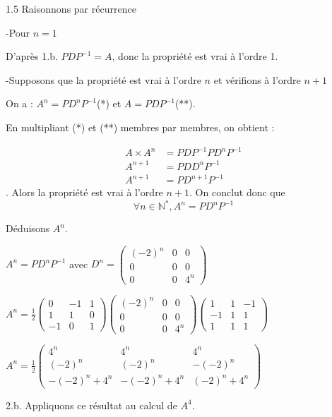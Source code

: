\documentclass[12pt]{article}
\begin{document}
\begin{spacing}{1.5}
Raisonnons par récurrence

-Pour $n=1$

D'après 1.b. $PDP^{-1}=A$, donc la propriété est vrai à l'ordre 1.

-Supposons que la propriété est vrai à l'ordre $n$ et vérifions à l'ordre $n+1$

On a : $A^n = PD^nP^{-1}$(*) et  $A=PDP^{-1}$(**).

En multipliant (*) et (**) membres par membres, on obtient :

\begin{align*}
A\times A^n &= PDP^{-1}PD^nP^{-1}\\
A^{n+1} &=PDD^nP^{-1}\\
A^{n+1} &=PD^{n+1}P^{-1}
\end{align*}.
Alors la propriété est vrai à l'ordre $n+1$. On conclut donc que \[
\forall {n\in\mathbb{N}^*}, A^n = PD^nP^{-1}
\]

Déduisons $A^n$.

$A^n = PD^nP^{-1}$ avec $D^n=\begin{pmatrix}
(-2)^n & 0& 0 \\ 
0 & 0 & 0 \\ 
0 & 0 & 4^n
\end{pmatrix}$

$A^n=\frac{1}{2}\begin{pmatrix}
0  & -1 & 1 \\ 
1  & 1  & 0 \\ 
-1 & 0  & 1
\end{pmatrix}\begin{pmatrix}
(-2)^n & 0& 0 \\ 
0 & 0 & 0 \\ 
0 & 0 & 4^n
\end{pmatrix}\begin{pmatrix}
1  & 1 & -1 \\ 
-1  & 1  & 1 \\ 
1 & 1  & 1
\end{pmatrix}$

$A^n=\frac{1}{2}\begin{pmatrix}
4^n & 4^n & 4^n \\ 
(-2)^n & (-2)^n & -(-2)^n \\ 
-(-2)^n+4^n & -(-2)^n+4^n & (-2)^n+4^n
\end{pmatrix}$

2.b. Appliquons ce résultat au  calcul de $A^4$. 


\end{spacing}
\end{document}
